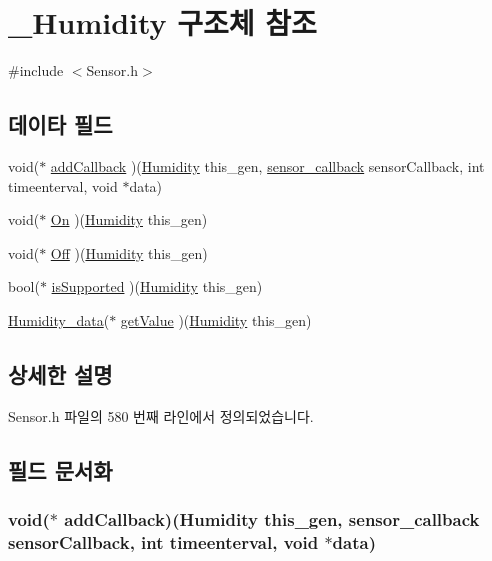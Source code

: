 \hypertarget{struct___humidity}{\section{\-\_\-\-Humidity 구조체 참조}
\label{struct___humidity}
}


{\ttfamily \#include $<$Sensor.\-h$>$}

\subsection*{데이타 필드}
\begin{DoxyCompactItemize}
\item 
void($\ast$ \hyperlink{struct___humidity_a3f415b07cdbb2f78be0c4ca124dd8317}{add\-Callback} )(\hyperlink{_sensor_8h_a5abed9efddb633f3bc97781dbd9870b2}{Humidity} this\-\_\-gen, \hyperlink{_sensor_8h_ad8114207845fc5e0aa30832f0c718cd6}{sensor\-\_\-callback} sensor\-Callback, int timeenterval, void $\ast$data)
\item 
void($\ast$ \hyperlink{struct___humidity_a2af8c8e73fea50ffa971fb6c71d2072d}{On} )(\hyperlink{_sensor_8h_a5abed9efddb633f3bc97781dbd9870b2}{Humidity} this\-\_\-gen)
\item 
void($\ast$ \hyperlink{struct___humidity_aca592716abbab5d419af4917c93717c8}{Off} )(\hyperlink{_sensor_8h_a5abed9efddb633f3bc97781dbd9870b2}{Humidity} this\-\_\-gen)
\item 
bool($\ast$ \hyperlink{struct___humidity_adda26eb4f1a4ee9bda6cacbbe67ec5b4}{is\-Supported} )(\hyperlink{_sensor_8h_a5abed9efddb633f3bc97781dbd9870b2}{Humidity} this\-\_\-gen)
\item 
\hyperlink{_sensor_8h_ab28ba6903f252ea8a21375f598f0b83f}{Humidity\-\_\-data}($\ast$ \hyperlink{struct___humidity_ab66479293e120169b7f5be17bb6b307a}{get\-Value} )(\hyperlink{_sensor_8h_a5abed9efddb633f3bc97781dbd9870b2}{Humidity} this\-\_\-gen)
\end{DoxyCompactItemize}


\subsection{상세한 설명}


Sensor.\-h 파일의 580 번째 라인에서 정의되었습니다.



\subsection{필드 문서화}
\hypertarget{struct___humidity_a3f415b07cdbb2f78be0c4ca124dd8317}{
\subsubsection[{add\-Callback}]{\setlength{\rightskip}{0pt plus 5cm}void($\ast$  add\-Callback)({\bf Humidity} this\-\_\-gen, {\bf sensor\-\_\-callback} sensor\-Callback, int timeenterval, void $\ast$data)}}\label{struct___humidity_a3f415b07cdbb2f78be0c4ca124dd8317}


